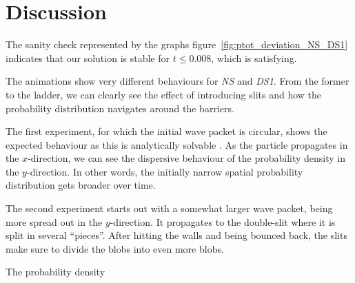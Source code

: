 \section{Discussion}\label{sec:discussion}



The sanity check represented by the graphs figure~\ref{fig:ptot_deviation_NS_DS1} indicates that our solution is stable for $t\leq 0.008$, which is satisfying. 


The animations show very different behaviours for \textit{NS} and \textit{DS1}. From the former to the ladder, we can clearly see the effect of introducing slits and how the probability distribution navigates around the barriers. 

The first experiment, for which the initial wave packet is circular, shows the expected behaviour as this is analytically solvable . As the particle propagates in the $x$-direction, we can see the dispersive behaviour of the probability density in the $y$-direction. In other words, the initially narrow spatial probability distribution gets broader over time.


The second experiment starts out with a somewhat larger wave packet, being more spread out in the $y$-direction. It propagates to the double-slit where it is split in several ``pieces''. After hitting the walls and being bounced back, the slits make sure to divide the blobs into even more blobs. 






The probability density 









